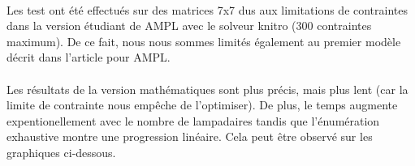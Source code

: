  \paragraph{} Les test ont été effectués sur des matrices 7x7 dus aux limitations de contraintes dans la version étudiant de AMPL avec le solveur knitro (300 contraintes maximum).  De ce fait, nous nous sommes limités également au premier modèle décrit dans l'article pour AMPL.

\paragraph{} Les résultats de la version mathématiques sont plus précis, mais plus lent (car la limite de contrainte nous empêche de l'optimiser). De plus, le temps augmente expentionellement avec le nombre de lampadaires tandis que l'énumération exhaustive montre une progression linéaire. Cela peut être observé sur les graphiques ci-dessous.


